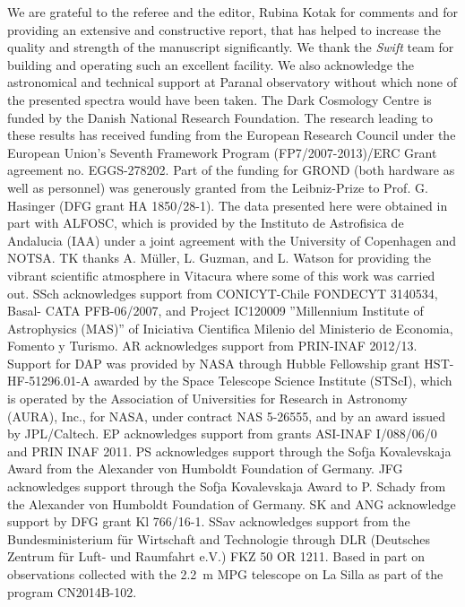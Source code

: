 \documentclass[traditabstract, longauth]{aa}
\begin{document}
\begin{acknowledgements}
We are grateful to the referee and the editor, Rubina Kotak for comments and for providing an extensive and constructive report, that has helped to increase the quality and strength of the manuscript significantly. We thank the \textit{Swift} team for building and operating such an excellent facility. We also acknowledge the astronomical and technical support at Paranal observatory without which none of the presented spectra would have been taken. The Dark Cosmology Centre is funded by the Danish National Research Foundation. The research leading to these results has received funding from the European Research Council under the European Union's Seventh Framework Program (FP7/2007-2013)/ERC Grant agreement no. EGGS-278202. Part of the funding for GROND (both hardware as well as personnel) was generously granted from the Leibniz-Prize to Prof. G. Hasinger (DFG grant HA 1850/28-1). The data presented here were obtained in part with ALFOSC, which is provided by the Instituto de Astrofisica de Andalucia (IAA) under a joint agreement with the University of Copenhagen and NOTSA. TK thanks A. M\"{u}ller, L. Guzman, and L. Watson for providing the vibrant scientific atmosphere in Vitacura where some of this work was carried out. SSch acknowledges support from CONICYT-Chile FONDECYT 3140534, Basal- CATA PFB-06/2007, and Project IC120009 ''Millennium Institute of Astrophysics (MAS)'' of Iniciativa Cientifica Milenio del Ministerio de Economia, Fomento y Turismo. AR acknowledges support from PRIN-INAF 2012/13. Support for DAP was provided by NASA through Hubble Fellowship grant HST-HF-51296.01-A awarded by the Space Telescope Science Institute (STScI), which is operated by the Association of Universities  for Research in Astronomy (AURA), Inc., for NASA, under contract NAS 5-26555, and by an award issued by JPL/Caltech. EP acknowledges support from grants ASI-INAF I/088/06/0 and PRIN INAF 2011. PS acknowledges support through the Sofja Kovalevskaja Award from the Alexander von Humboldt Foundation of Germany. JFG acknowledges support through the Sofja Kovalevskaja Award to P. Schady from the Alexander von Humboldt Foundation of Germany. SK and ANG acknowledge support by DFG grant Kl 766/16-1. SSav acknowledges support from the Bundesministerium f\"ur Wirtschaft and Technologie through DLR (Deutsches Zentrum f\"ur Luft- und Raumfahrt e.V.) FKZ 50 OR 1211. Based in part on observations collected with the 2.2~m MPG telescope on La Silla  as part of the program CN2014B-102.
\end{acknowledgements}
\end{document}
